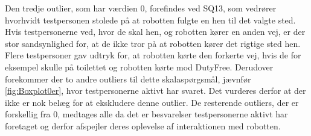 Den tredje outlier, som har værdien 0, forefindes ved SQ13, som vedrører hvorhvidt testpersonen stolede på at robotten fulgte en hen til det valgte sted. Hvis testpersonerne ved, hvor de skal hen, og robotten kører en anden vej, er der stor sandsynlighed for, at de ikke tror på at robotten kører det rigtige sted hen. Flere testpersoner gav udtryk for, at robotten kørte den forkerte vej, hvis de for eksempel skulle på toilettet og robotten kørte mod DutyFree. Derudover forekommer der to andre outliers til dette skalaspørgsmål, jævnfør \autoref{fig:Boxplot0er}, hvor testpersonerne aktivt har svaret. Det vurderes derfor at der ikke er nok belæg for at ekskludere denne outlier. \blankline
%
De resterende outliers, der er forskellig fra 0, medtages alle da det er besvarelser testpersonerne aktivt har foretaget og derfor afspejler deres oplevelse af interaktionen med robotten. 
\newpage 
